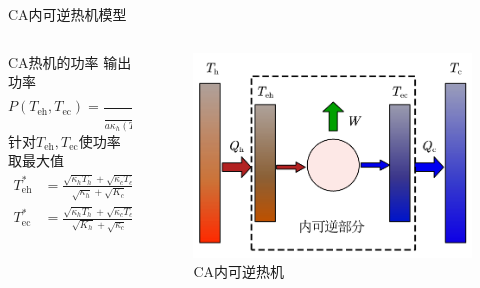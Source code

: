 \documentclass{beamer}
\begin{document}
\begin{frame}{CA内可逆热机模型}
    \begin{columns}
        \begin{column}{.62\textwidth}
            \begin{block}{CA热机的功率}
                \pause
                输出功率
                \begin{equation}
                    P\left(T_{\mathrm{eh}}, T_{\mathrm{ec}}\right)=\frac{T_{\mathrm{eh}}-T_{\mathrm{ec}}}{\frac{T_{\mathrm{eh}}}{a \kappa_{h}\left(T_{h}-T_{\mathrm{eh}}\right)}+\frac{T_{\mathrm{ec}}}{a \kappa_{c}\left(T_{\mathrm{ec}}-T_{c}\right)}}
                    \label{eq2}
                \end{equation}
                \pause 针对$T_{\mathrm{eh}}, T_{\mathrm{ec}}$使功率取最大值
                \begin{equation}
                    \begin{split}
                        T_{\mathrm{eh}}^{*}&=\frac{\sqrt{\kappa_{h} T_{h}}+\sqrt{\kappa_{c} T_{c}}}{\sqrt{\kappa_{h}}+\sqrt{K_{c}}} \sqrt{T_{h}}\\
                        T_{\mathrm{ec}}^{*}&=\frac{\sqrt{\kappa_{h} T_{h}}+\sqrt{\kappa_{c} T_{c}}}{\sqrt{K_{h}}+\sqrt{\kappa_{c}}} \sqrt{T_{c}}
                    \end{split}
                    \label{eq3}
                \end{equation}
            \end{block}
        \end{column}
    
        \begin{column}{.38\textwidth}
            \onslide
            \begin{figure}
                \begin{center}
                    \includegraphics[width=\textwidth]{p1.png}
                \end{center}
                \setcounter{figure}{0}
                \caption{CA内可逆热机}
            \end{figure}
        \end{column}
    \end{columns}
\end{frame}
\end{document}
